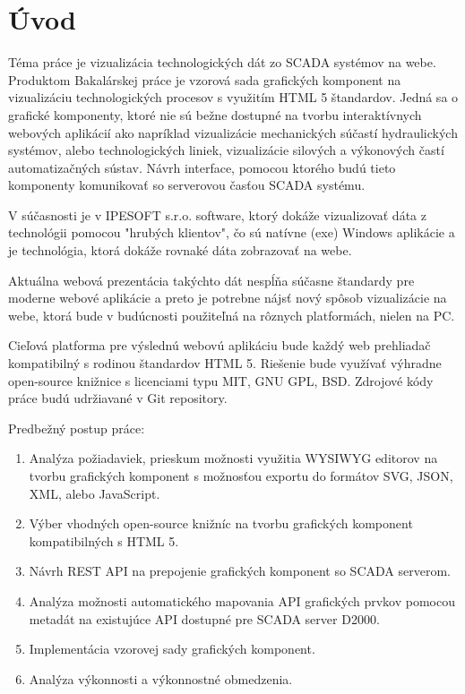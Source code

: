 \chapter*{Úvod}

Téma práce je vizualizácia technologických dát zo SCADA systémov na webe.  Produktom Bakalárskej práce je  vzorová sada grafických komponent na vizualizáciu technologických procesov s využitím HTML 5 štandardov.  Jedná sa o grafické komponenty, ktoré nie sú bežne dostupné na tvorbu interaktívnych webových aplikácií ako napríklad vizualizácie mechanických súčastí hydraulických systémov, alebo technologických liniek, vizualizácie silových a výkonových častí automatizačných sústav. 
Návrh  interface, pomocou ktorého budú tieto komponenty komunikovať so serverovou časťou SCADA systému. 

V súčasnosti je v IPESOFT s.r.o. software, ktorý dokáže vizualizovať dáta z technológii pomocou "hrubých klientov",  čo sú natívne (exe) Windows aplikácie a je technológia,  ktorá dokáže rovnaké dáta zobrazovať na webe. 

Aktuálna webová prezentácia takýchto dát nespĺňa súčasne štandardy pre moderne webové aplikácie a preto je potrebne nájsť nový spôsob vizualizácie na webe, ktorá bude v budúcnosti použiteľná na rôznych platformách, nielen na PC. 


Cieľová platforma pre výslednú webovú aplikáciu bude každý web prehliadač kompatibilný s rodinou štandardov HTML 5. Riešenie bude využívať výhradne open-source knižnice s licenciami typu MIT, GNU GPL, BSD. Zdrojové kódy práce budú udržiavané v Git repository.

Predbežný postup práce:

\begin{enumerate}
\item  Analýza požiadaviek, prieskum možnosti využitia WYSIWYG editorov na tvorbu grafických komponent s možnosťou exportu do formátov SVG, JSON, XML, alebo JavaScript.
\item Výber vhodných open-source knižníc na tvorbu grafických komponent kompatibilných s HTML 5.
\item Návrh REST API na prepojenie grafických komponent so SCADA serverom.
\item  Analýza možnosti automatického mapovania API grafických prvkov pomocou metadát na existujúce API dostupné pre SCADA server D2000.
\item  Implementácia vzorovej sady grafických komponent.
\item  Analýza výkonnosti a výkonnostné obmedzenia.
\end{enumerate}